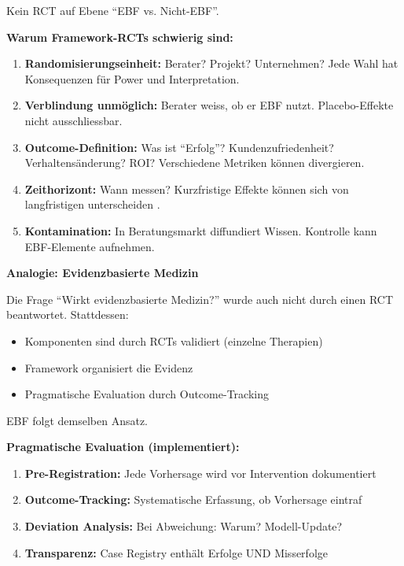 \begin{tcolorbox}[colback=green!5!white, colframe=green!75!black,
    title=W3-$\mathcal{W}$-L: Lang (Wissenschaft)]
Kein RCT auf Ebene ``EBF vs. Nicht-EBF''.

\textbf{Warum Framework-RCTs schwierig sind:}

\begin{enumerate}
    \item \textbf{Randomisierungseinheit:} Berater? Projekt? Unternehmen? Jede Wahl hat Konsequenzen für Power und Interpretation.

    \item \textbf{Verblindung unmöglich:} Berater weiss, ob er EBF nutzt. Placebo-Effekte nicht ausschliessbar.

    \item \textbf{Outcome-Definition:} Was ist ``Erfolg''? Kundenzufriedenheit? Verhaltensänderung? ROI? Verschiedene Metriken können divergieren.

    \item \textbf{Zeithorizont:} Wann messen? Kurzfristige Effekte können sich von langfristigen unterscheiden \citep{benartzi2017should}.

    \item \textbf{Kontamination:} In Beratungsmarkt diffundiert Wissen. Kontrolle kann EBF-Elemente aufnehmen.
\end{enumerate}

\textbf{Analogie: Evidenzbasierte Medizin}

Die Frage ``Wirkt evidenzbasierte Medizin?'' wurde auch nicht durch einen RCT beantwortet. Stattdessen:
\begin{itemize}[nosep]
    \item Komponenten sind durch RCTs validiert (einzelne Therapien)
    \item Framework organisiert die Evidenz
    \item Pragmatische Evaluation durch Outcome-Tracking
\end{itemize}

EBF folgt demselben Ansatz.

\textbf{Pragmatische Evaluation (implementiert):}

\begin{enumerate}
    \item \textbf{Pre-Registration:} Jede Vorhersage wird vor Intervention dokumentiert
    \item \textbf{Outcome-Tracking:} Systematische Erfassung, ob Vorhersage eintraf
    \item \textbf{Deviation Analysis:} Bei Abweichung: Warum? Modell-Update?
    \item \textbf{Transparenz:} Case Registry enthält Erfolge UND Misserfolge
\end{enumerate}


\end{tcolorbox}
